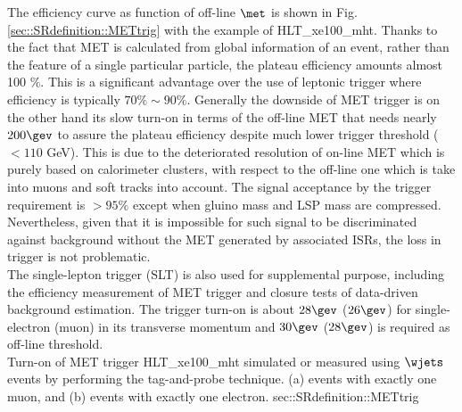 The efficiency curve as function of off-line $\met$ is shown in Fig. \ref{sec::SRdefinition::METtrig} with the example of HLT\_xe100\_mht.
Thanks to the fact that MET is calculated from global information of an event, rather than the feature of a single particular particle, the plateau efficiency amounts almost 100 $\%$. 
This is a significant advantage over the use of leptonic trigger where efficiency is typically $70\% \sim 90\%$. 
Generally the downside of MET trigger is on the other hand its slow turn-on in terms of the off-line MET that needs nearly $200 \gev$ to assure the plateau efficiency despite much lower trigger threshold ($<110$ GeV). This is due to the deteriorated resolution of on-line MET which is purely based on calorimeter clusters, with respect to the off-line one which is take into muons and soft tracks into account. The signal acceptance by the trigger requirement is  $>95\%$ except when gluino mass and LSP mass are compressed. Nevertheless, given that it is impossible for such signal to be discriminated against background without the MET generated by associated ISRs, the loss in trigger is not problematic. \\


The single-lepton trigger (SLT) is also used for supplemental purpose, including the efficiency measurement of MET trigger and closure tests of data-driven background estimation. The trigger turn-on is about $28\gev$ ($26\gev$) for single-electron (muon) in its transverse momentum and $30\gev$ ($28\gev$) is required as off-line threshold. \\


{Turn-on of MET trigger HLT\_xe100\_mht simulated or measured using $\wjets$ events by performing the tag-and-probe technique. (a) events with exactly one muon, and (b) events with exactly one electron.}
{sec::SRdefinition::METtrig}









